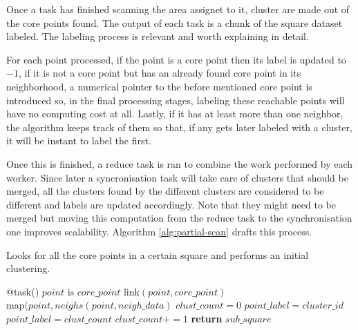 \documentclass[10pt,journal,compsoc]{IEEEtran}
\let\MYoriglatexcaption\caption
\renewcommand{\caption}[2][\relax]{\MYoriglatexcaption[#2]{#2}}
\begin{document}
Once a task has finished scanning the area assignet to it, cluster are made out of the core points found. The output of each task is a chunk of the square dataset labeled. The labeling process is relevant and worth explaining in detail.

For each point processed, if the point is a core point then its label is updated to $-1$, if it is not a core point but has an already found core point in its neighborhood, a numerical pointer to the before mentioned core point is introduced so, in the final processing stages, labeling these reachable points will have no computing cost at all. Lastly, if it has at least more than one neighbor, the algorithm keeps track of them so that, if any gets later labeled with a cluster, it will be instant to label the first. 

Once this is finished, a reduce task is ran to combine the work performed by each worker. Since later a syncronisation task will take care of clusters that should be merged, all the clusters found by the different clusters are considered to be different and labels are updated accordingly. Note that they might need to be merged but moving this computation from the reduce task to the synchronisation one improves scalability. Algorithm \ref{alg:partial-scan} drafts this process.

\begin{algorithm}
  \caption{Looks for all the core points in a certain square and performs an initial clustering. \label{alg:partial-scan}}
  \begin{algorithmic}[1]
    \State @task()
        \State {}
                \State $point \text{ is } core\_point $
                \Else
                    \State $\text{link}(point, core\_point)$
                \Else
                    \State $\text{map}(point, neighs(point, neigh\_data)$
                \EndIf
            \EndIf
        \EndFor
        \State {}
        \State $clust\_count = 0$
                \State $point\_label = cluster\_id$
            \Else 
                \State $point\_label = clust\_count$
                \State $clust\_count += 1$
            \EndIf
        \EndFor
        \State \textbf{return} $sub\_square$
    \EndFunction
  \end{algorithmic}
\end{algorithm}
\end{document}

